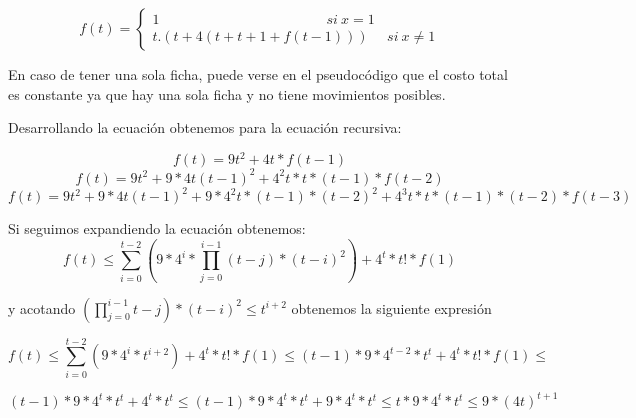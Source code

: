 \documentclass[10pt, a4paper,english,spanish]{article}
\begin{document}
\begin{equation*}
	f(t) =
	\begin{cases}
		1 \ \ \ \ \ \ \ \ \ \ \ \ \ \ \ \ \ \ \ \ \ \ \ \ \ \ \ \ \ \ \ \ \ \ \ \ \ \ \ \ \ \ \ \ \ \ \ \ \ \ \ \ \ \ si \ x = 1 \\ %
		t.(t + 4(t + t + 1 + f(t-1))) \ \ \ \ \ \ si \ x \neq 1
	\end{cases}
\end{equation*}

En caso de tener una sola ficha, puede verse en el pseudocódigo que el costo total
es constante ya que hay una sola ficha y no tiene movimientos posibles.

Desarrollando la ecuación obtenemos para la ecuación recursiva:

\begin{equation*}
 f(t) = 9t^2 + 4t*f(t-1) 
\end{equation*}
\begin{equation*}
 f(t) = 9t^2 + 9*4t (t-1)^2 + 4^2t*t*(t-1)*f(t-2) 
\end{equation*}
\begin{equation*}
 f(t) = 9t^2 + 9*4t (t-1)^2 + 9*4^2t*(t-1)*(t-2)^2  + 4^3t*t*(t-1)*(t-2)*f(t-3) 
\end{equation*}

Si seguimos expandiendo la ecuación obtenemos:
\begin{equation*}
f(t) \leq \sum_{i = 0}^{ t-2 } \left( 9*4^i*\prod_{j = 0}^{i-1}(t - j)*(t-i)^2 \right) + 4^t*t!*f(1)
\end{equation*}

y acotando $ (\prod_{j = 0}^{i-1} t - j)*(t-i)^2 \leq t^{i+2} $ obtenemos la siguiente expresión

\begin{equation*}
    f(t) \leq \sum_{i = 0}^{ t-2 } \left( 9*4^i*t^{i+2} \right) + 4^t*t!*f(1) \leq (t-1)*9*4^{t-2}*t^t + 4^t*t!*f(1) \leq
\end{equation*}

\begin{equation*}
    (t-1)*9*4^t*t^t + 4^t*t^t \leq (t-1)*9*4^t*t^t + 9*4^t*t^t \leq t*9*4^t*t^t \leq  9*(4t)^{t+1}
\end{equation*}
\end{document}
